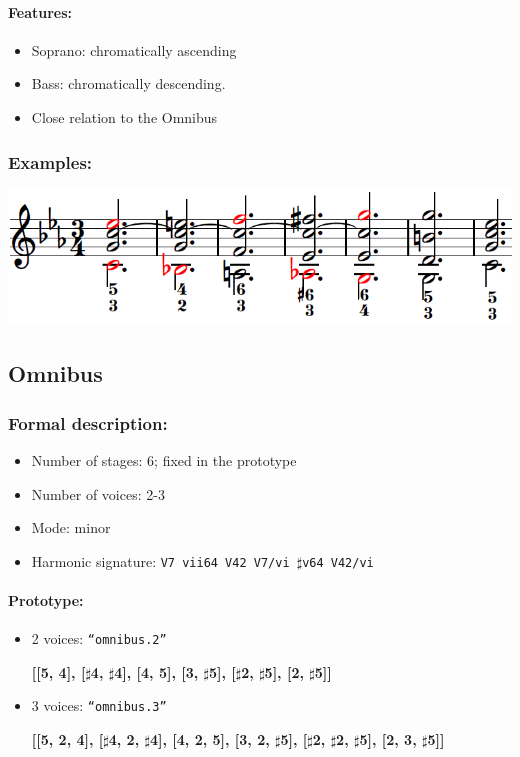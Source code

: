 \documentclass[11pt, openany]{article}
\begin{document}
\paragraph{Features:}
\begin{itemize}
\item Soprano: chromatically ascending
\item Bass: chromatically descending.
\item Close relation to the Omnibus
\end{itemize}

\subsubsection{Examples:}
\begin{center}
\includegraphics[scale=0.8]{morte.png}
\end{center}


	\subsection{Omnibus}
	
\subsubsection{Formal description:}
\begin{itemize}
\item Number of stages: 6; fixed in the prototype
\item Number of voices: 2-3
\item Mode: minor
\item Harmonic signature: \texttt{V7 vii64 V42 V7/vi $\sharp$v64 V42/vi}
\end{itemize}

\paragraph{Prototype:}
\begin{itemize}
\item 2 voices: \texttt{“omnibus.2”}
	\begin{center}
	\textbf{[[5, 4], [$\sharp$4, $\sharp$4], [4, 5], [3, $\sharp$5], [$\sharp$2, $\sharp$5], [2, $\sharp$5]]}
	\end{center}
\item 3 voices: \texttt{“omnibus.3”}
	\begin{center}
	\textbf{[[5, 2, 4], [$\sharp$4, 2, $\sharp$4], [4, 2, 5], [3, 2, $\sharp$5], [$\sharp$2, $\sharp$2, $\sharp$5], [2, 3, $\sharp$5]]}
	\end{center}
\end{itemize}
\end{document}
